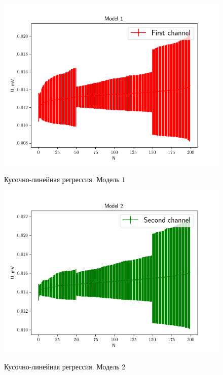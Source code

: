 \begin{figure}[H]
	\begin{center}
		\includegraphics[scale=0.72]{partial1}
		\label{pic:part1}
		\caption{Кусочно-линейная регрессия. Модель 1}
	\end{center}
\end{figure}

\begin{figure}[H]
	\begin{center}
		\includegraphics[scale=0.72]{partial2}
		\label{pic:part2}
		\caption{Кусочно-линейная регрессия. Модель 2}
	\end{center}
\end{figure}

